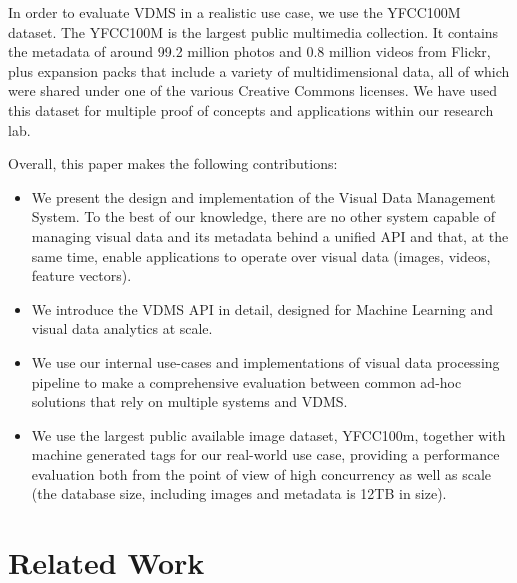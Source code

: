 In order to evaluate VDMS in a realistic use case,
we use the YFCC100M dataset\cite{Thomee_2016}.
The YFCC100M is the largest public multimedia collection.
It contains the metadata of around 99.2 million photos
and 0.8 million videos from Flickr,
plus expansion packs that include a variety of multidimensional data,
all of which were shared under one of the various Creative Commons licenses.
We have used this dataset for multiple proof of concepts and
applications within our research lab.

Overall, this paper makes the following contributions:

\begin{itemize}
\item We present the design and implementation of the Visual Data Management System.
To the best of our knowledge, there are no other system capable of
managing visual data and its metadata behind a unified API
and that, at the same time, enable applications to operate over visual data
(images, videos, feature vectors).

\item We introduce the VDMS API in detail, designed for Machine Learning and visual
data analytics at scale.

\item We use our internal use-cases and implementations of visual data processing
pipeline to make a comprehensive evaluation between common ad-hoc solutions
that rely on multiple systems and VDMS.

\item We use the largest public available image dataset, YFCC100m, together
with machine generated tags for our real-world use case, providing a performance
evaluation both from the point of view of high concurrency as well as
scale (the database size, including images and metadata is 12TB in size).
\end{itemize}

\section{Related Work}

